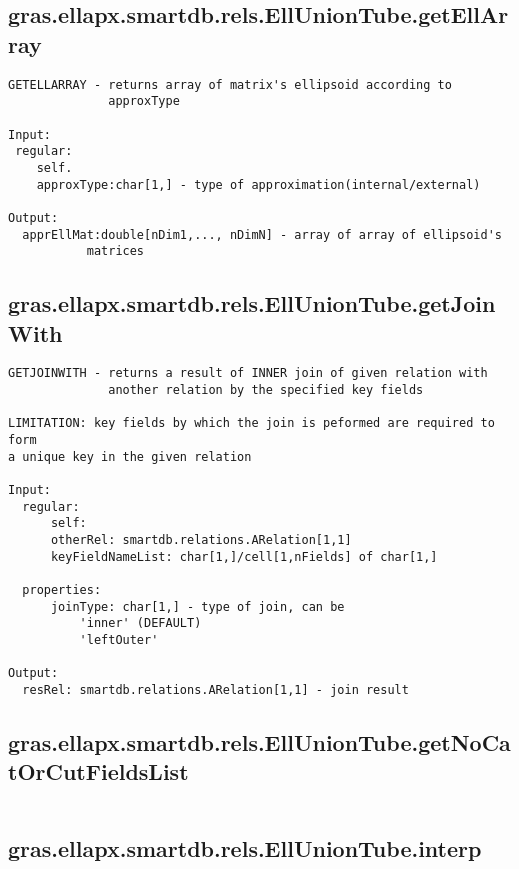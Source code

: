 \subsection{\texorpdfstring{gras.ellapx.smartdb.rels.EllUnionTube.getEllArray}{getEllArray}}\label{method:gras.ellapx.smartdb.rels.EllUnionTube.getEllArray}
\begin{verbatim}
GETELLARRAY - returns array of matrix's ellipsoid according to
              approxType

Input:
 regular:
    self.
    approxType:char[1,] - type of approximation(internal/external)

Output:
  apprEllMat:double[nDim1,..., nDimN] - array of array of ellipsoid's
           matrices
\end{verbatim}
\subsection{\texorpdfstring{gras.ellapx.smartdb.rels.EllUnionTube.getJoinWith}{getJoinWith}}\label{method:gras.ellapx.smartdb.rels.EllUnionTube.getJoinWith}
\begin{verbatim}
GETJOINWITH - returns a result of INNER join of given relation with
              another relation by the specified key fields

LIMITATION: key fields by which the join is peformed are required to form
a unique key in the given relation

Input:
  regular:
      self:
      otherRel: smartdb.relations.ARelation[1,1]
      keyFieldNameList: char[1,]/cell[1,nFields] of char[1,]

  properties:
      joinType: char[1,] - type of join, can be
          'inner' (DEFAULT)
          'leftOuter'

Output:
  resRel: smartdb.relations.ARelation[1,1] - join result
\end{verbatim}
\subsection{\texorpdfstring{gras.ellapx.smartdb.rels.EllUnionTube.getNoCatOrCutFieldsList}{getNoCatOrCutFieldsList}}\label{method:gras.ellapx.smartdb.rels.EllUnionTube.getNoCatOrCutFieldsList}
\begin{verbatim}

\end{verbatim}
\subsection{\texorpdfstring{gras.ellapx.smartdb.rels.EllUnionTube.interp}{interp}}\label{method:gras.ellapx.smartdb.rels.EllUnionTube.interp}
\begin{verbatim}

\end{verbatim}
